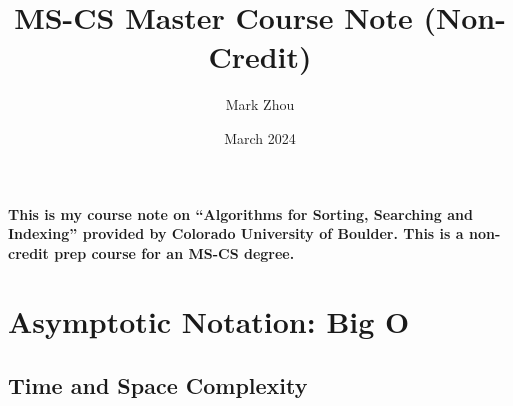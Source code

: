 \documentclass{article}
\title{MS-CS Master Course Note (Non-Credit)}
\author{Mark Zhou}
\date{March 2024}
\begin{document}
\maketitle
\doublespacing

\paragraph{This is my course note on “Algorithms for Sorting, Searching and Indexing” provided by Colorado University of Boulder. 
This is a non-credit prep course for an MS-CS degree.}

\newpage
\tableofcontents
\newpage

\section{Asymptotic Notation: Big O}

\subsection{Time and Space Complexity}
\end{document}
